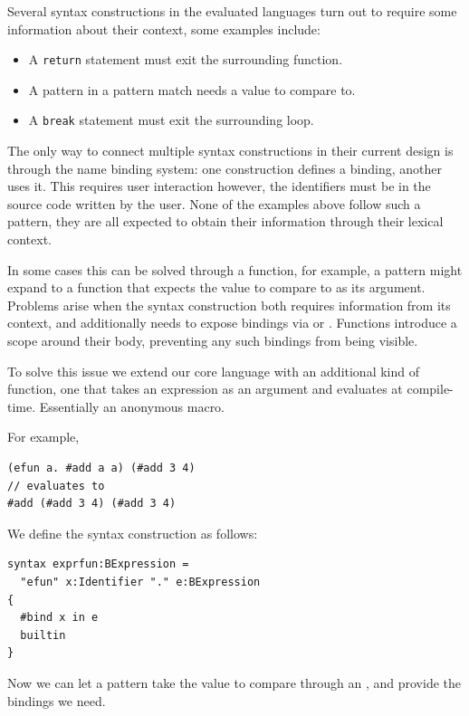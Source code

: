 \documentclass{kththesis}
\begin{document}
Several syntax constructions in the evaluated languages turn out to require some information about their context, some examples include:

\begin{itemize}
  \item A \texttt{return} statement must exit the surrounding function.
  \item A pattern in a pattern match needs a value to compare to.
  \item A \texttt{break} statement must exit the surrounding loop.
\end{itemize}

The only way to connect multiple syntax constructions in their current design is through the name binding system: one construction defines a binding, another uses it. This requires user interaction however, the identifiers must be in the source code written by the user. None of the examples above follow such a pattern, they are all expected to obtain their information through their lexical context.

In some cases this can be solved through a function, for example, a pattern might expand to a function that expects the value to compare to as its argument. Problems arise when the syntax construction both requires information from its context, and additionally needs to expose bindings via  or . Functions introduce a scope around their body, preventing any such bindings from being visible.

To solve this issue we extend our core language with an additional kind of function, one that takes an expression as an argument and evaluates at compile-time. Essentially an anonymous macro.

For example,

\begin{verbatim}
(efun a. #add a a) (#add 3 4)
// evaluates to
#add (#add 3 4) (#add 3 4)
\end{verbatim}

We define the syntax construction as follows:

\begin{verbatim}
syntax exprfun:BExpression =
  "efun" x:Identifier "." e:BExpression
{
  #bind x in e
  builtin
}
\end{verbatim}

Now we can let a pattern take the value to compare through an , and provide the bindings we need.
\end{document}

